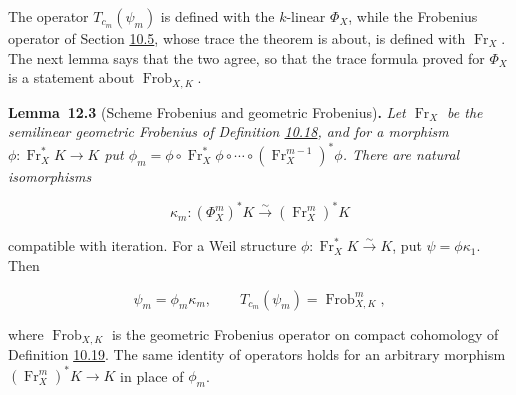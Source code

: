 \documentclass[11pt]{article}
\newenvironment{bpstatement}[2]{\par\addvspace{0.6\baselineskip}\noindent\textbf{#1}#2\textbf{.}\enspace\ignorespaces}
  {\par\addvspace{0.4\baselineskip}}
\newenvironment{bpstatementit}[2]{\begin{bpstatement}{#1}{#2}\itshape\ignorespaces}{\end{bpstatement}}
\begin{document}
\label{bp233}%
The operator \(T_{c_m}(\psi_m)\) is defined with the \(k\)-linear \(\Phi_X\), while the Frobenius operator of Section \hyperref[bp154]{10.5}, whose trace the theorem is about, is defined with \(\operatorname{Fr}_X\). The next lemma says that the two agree, so that the trace formula proved for \(\Phi_X\) is a statement about \(\operatorname{Frob}_{X,K}\).

\label{bp234}%
\begin{bpstatementit}{Lemma~12.3}{ (Scheme Frobenius and geometric Frobenius)}
Let \(\operatorname{Fr}_X\) be the semilinear geometric Frobenius of Definition \hyperref[bp156]{10.18}, and for a morphism \(\phi:\operatorname{Fr}_X^*K\to K\) put \(\phi_m=\phi\circ \operatorname{Fr}_X^*\phi\circ\cdots\circ(\operatorname{Fr}_X^{m-1})^*\phi\). There are natural isomorphisms

\[
\kappa_m:(\Phi_X^m)^*K\xrightarrow{\sim}(\operatorname{Fr}_X^m)^*K
\]

compatible with iteration. For a Weil structure \(\phi:\operatorname{Fr}_X^*K\xrightarrow{\sim}K\), put \(\psi=\phi\kappa_1\). Then

\[
\psi_m=\phi_m\kappa_m,
\qquad T_{c_m}(\psi_m)=\operatorname{Frob}_{X,K}^{m},
\]

where \(\operatorname{Frob}_{X,K}\) is the geometric Frobenius operator on compact cohomology of Definition \hyperref[bp158]{10.19}. The same identity of operators holds for an arbitrary morphism \((\operatorname{Fr}_X^m)^*K\to K\) in place of \(\phi_m\).
\end{bpstatementit}
\end{document}
